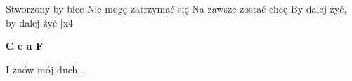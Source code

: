 \documentclass[../../../songbook.tex]{subfiles}
\begin{document}
\-\hspace{1cm} Stworzony by biec \newline
\-\hspace{1cm} Nie mogę zatrzymać się \newline
\-\hspace{1cm} Na zawsze zostać chcę \newline
\-\hspace{1cm} By dalej żyć, by dalej żyć     |x4 \newline

{\color{red}\textbf{C e a F} } \newline

I znów mój duch...\newline
\end{document}
